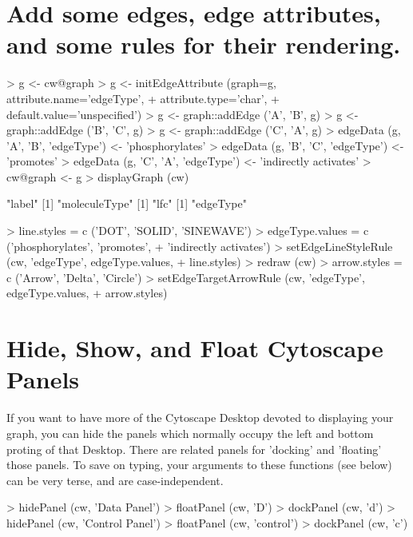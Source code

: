 \documentclass[12pt]{article}
\begin{document}
\section{Add some edges, edge attributes, and some rules for their rendering.}
\begin{Schunk}
\begin{Sinput}
>   g <- cw@graph
>   g <- initEdgeAttribute (graph=g,  attribute.name='edgeType',
+                           attribute.type='char',
+                           default.value='unspecified')
>   g <- graph::addEdge ('A', 'B', g)
>   g <- graph::addEdge ('B', 'C', g)
>   g <- graph::addEdge ('C', 'A', g)
>   edgeData (g, 'A', 'B', 'edgeType') <- 'phosphorylates'
>   edgeData (g, 'B', 'C', 'edgeType') <- 'promotes'
>   edgeData (g, 'C', 'A', 'edgeType') <- 'indirectly activates'
>   cw@graph <- g
>   displayGraph (cw)
\end{Sinput}
\begin{Soutput}
[1] "label"
[1] "moleculeType"
[1] "lfc"
[1] "edgeType"
\end{Soutput}
\begin{Sinput}
>   line.styles = c ('DOT', 'SOLID', 'SINEWAVE')
>   edgeType.values = c ('phosphorylates', 'promotes',
+                        'indirectly activates')
>   setEdgeLineStyleRule (cw, 'edgeType', edgeType.values,
+                         line.styles)
>   redraw (cw)
>   arrow.styles = c ('Arrow', 'Delta', 'Circle')
>   setEdgeTargetArrowRule (cw, 'edgeType', edgeType.values,
+                           arrow.styles)
\end{Sinput}
\end{Schunk}

\section{Hide, Show, and Float Cytoscape Panels}
If you want to have more of the Cytoscape Desktop devoted to displaying your graph, you can hide the panels which normally occupy the left and bottom proting of that Desktop.  There are related panels for 'docking' and 'floating' those panels.  To save on typing, your arguments to these functions (see below) can be very terse, and are case-independent.
\begin{Schunk}
\begin{Sinput}
>   hidePanel (cw, 'Data Panel')
>   floatPanel (cw, 'D')
>   dockPanel (cw, 'd')
>   hidePanel (cw, 'Control Panel')
>   floatPanel (cw, 'control')
>   dockPanel (cw, 'c')
\end{Sinput}
\end{Schunk}
\end{document}
